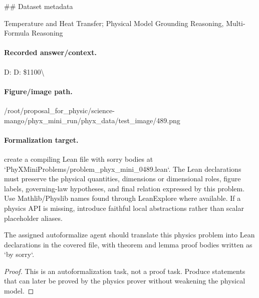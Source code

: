 \#\# Dataset metadata

Temperature and Heat Transfer; Physical Model Grounding Reasoning, Multi-Formula Reasoning

\paragraph{Recorded answer/context.}
D: D: \$1100\textbackslash{}

\paragraph{Figure/image path.}
/root/proposal\_for\_physic/science-mango/phyx\_mini\_run/phyx\_data/test\_image/489.png

\paragraph{Formalization target.}
create a compiling Lean file with sorry bodies at `PhyXMiniProblems/problem\_phyx\_mini\_0489.lean`. The Lean declarations must preserve the physical quantities, dimensions or dimensional roles, figure labels, governing-law hypotheses, and final relation expressed by this problem.
Use Mathlib/Physlib names found through LeanExplore where available. If a physics API is missing, introduce faithful local abstractions rather than scalar placeholder aliases.

\begin{theorem}
\label{thm:physics:phyx_mini_0489:target}
The assigned autoformalize agent should translate this physics problem into Lean declarations in the covered file, with theorem and lemma proof bodies written as `by sorry`.
\end{theorem}
\begin{proof}
This is an autoformalization task, not a proof task. Produce statements that can later be proved by the physics prover without weakening the physical model.
\end{proof}

